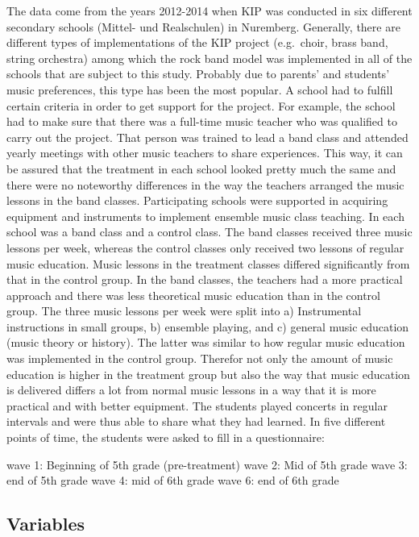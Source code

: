 \documentclass[a4, 12pt]{article}
\begin{document}
\label{sec:project}
The data come from the years 2012-2014 when KIP was conducted in six different secondary schools (Mittel- und Realschulen) in Nuremberg. Generally, there are different types of implementations of the KIP project (e.g.~choir, brass band, string orchestra) among which the rock band model was implemented in all of the schools that are subject to this study. Probably due to parents' and students' music preferences, this type has been the most popular. A school had to fulfill certain criteria in order to get support for the project. For example, the school had to make sure that there was a full-time music teacher who was qualified to carry out the project. That person was trained to lead a band class and attended yearly meetings with other music teachers to share experiences. This way, it can be assured that the treatment in each school looked pretty much the same and there were no noteworthy differences in the way the teachers arranged the music lessons in the band classes. Participating schools were supported in acquiring equipment and instruments to implement ensemble music class teaching. In each school was a band class and a control class. The band classes received three music lessons per week, whereas the control classes only received two lessons of regular music education. Music lessons in the treatment classes differed significantly from that in the control group. In the band classes, the teachers had a more practical approach and there was less theoretical music education than in the control group. The three music lessons per week were split into a) Instrumental instructions in small groups, b) ensemble playing, and c) general music education (music theory or history). The latter was similar to how regular music education was implemented in the control group. Therefor not only the amount of music education is higher in the treatment group but also the way that music education is delivered differs a lot from normal music lessons in a way that it is more practical and with better equipment. The students played concerts in regular intervals and were thus able to share what they had learned. In five different points of time, the students were asked to fill in a questionnaire:

wave 1: Beginning of 5th grade (pre-treatment)
wave 2: Mid of 5th grade
wave 3: end of 5th grade
wave 4: mid of 6th grade
wave 6: end of 6th grade

\hypertarget{variables}{%
\subsection{Variables}\label{variables}}
\end{document}
